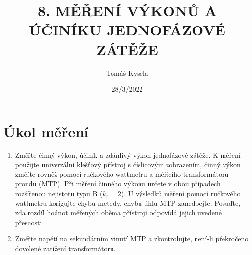 \documentclass{article}
\title{\textbf{8. MĚŘENÍ VÝKONŮ A ÚČINÍKU JEDNOFÁZOVÉ ZÁTĚŽE}}
\author{Tomáš Kysela}
\date{28/3/2022}
\begin{document}
\maketitle

\section{Úkol měření}
\begin{enumerate}
	\item Změřte činný výkon, účiník a zdánlivý výkon jednofázové zátěže. K měření použijte 
	univerzální klešťový přístroj s číslicovým zobrazením, činný výkon změřte rovněž pomocí ručkového wattmetru a měřicího transformátoru proudu (MTP). Při měření činného výkonu určete v obou případech rozšířenou nejistotu typu B ($k_r = 2$). U výsledků měření pomocí ručkového wattmetru korigujte chybu metody, chybu úhlu MTP zanedbejte. Posuďte, zda rozdíl hodnot měřených oběma přístroji odpovídá jejich uvedené přesnosti.
	\item Změřte napětí na sekundárním vinutí MTP a zkontrolujte, není-li překročeno dovolené 
	zatížení transformátoru.
\end{enumerate}
\end{document}
